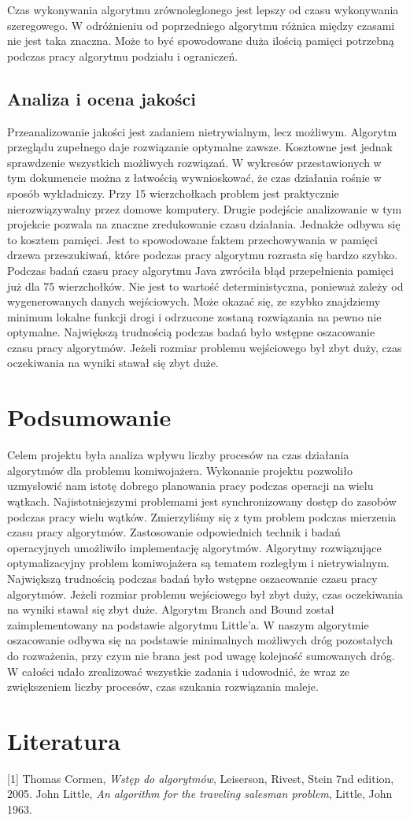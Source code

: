 \documentclass{article}
\begin{document}
	Czas wykonywania algorytmu zrównoleglonego jest lepszy od czasu wykonywania szeregowego. W odróżnieniu od poprzedniego algorytmu różnica między czasami nie jest taka znaczna. Może to być spowodowane duża ilością pamięci potrzebną podczas pracy algorytmu podziału i ograniczeń. 
	
	
	\subsection{Analiza i ocena jakości}
		Przeanalizowanie jakości jest zadaniem nietrywialnym, lecz możliwym. Algorytm przeglądu zupełnego daje rozwiązanie optymalne zawsze. Kosztowne jest jednak sprawdzenie wszystkich możliwych rozwiązań. W wykresów przestawionych w tym dokumencie można z łatwością wywnioskować, że czas działania rośnie w sposób wykładniczy. Przy 15 wierzchołkach problem jest praktycznie nierozwiązywalny przez domowe komputery. Drugie podejście analizowanie w tym projekcie pozwala na znaczne zredukowanie czasu działania. Jednakże odbywa się to kosztem pamięci. Jest to spowodowane faktem przechowywania w pamięci drzewa przeszukiwań, które podczas pracy algorytmu rozrasta się bardzo szybko. Podczas badań czasu pracy algorytmu Java zwróciła błąd przepełnienia pamięci już dla 75 wierzchołków. Nie jest to wartość deterministyczna, ponieważ zależy od wygenerowanych danych wejściowych. Może okazać się, ze szybko znajdziemy minimum lokalne funkcji drogi i odrzucone zostaną rozwiązania na pewno nie optymalne. Największą trudnością podczas badań było wstępne oszacowanie czasu pracy algorytmów. Jeżeli rozmiar problemu wejściowego był zbyt duży, czas oczekiwania na wyniki stawał się zbyt duże.
		\newpage
\section{Podsumowanie}
Celem projektu była analiza wpływu liczby procesów na czas działania algorytmów dla problemu komiwojażera. Wykonanie projektu pozwoliło uzmysłowić nam istotę dobrego planowania pracy podczas operacji na wielu wątkach. Najistotniejszymi problemami jest synchronizowany dostęp do zasobów podczas pracy wielu wątków. Zmierzyliśmy się z tym problem podczas mierzenia czasu pracy algorytmów. Zastosowanie odpowiednich technik i badań operacyjnych umożliwiło implementację algorytmów. Algorytmy rozwiązujące optymalizacyjny problem komiwojażera są tematem rozległym i nietrywialnym. Największą trudnością podczas badań było wstępne oszacowanie czasu pracy algorytmów. Jeżeli rozmiar problemu wejściowego był zbyt duży, czas oczekiwania na wyniki stawał się zbyt duże. Algorytm Branch and Bound został zaimplementowany na podstawie algorytmu Little'a. W naszym algorytmie oszacowanie odbywa się na podstawie minimalnych możliwych dróg pozostałych do rozważenia, przy czym nie brana jest pod uwagę kolejność sumowanych dróg. W całości udało zrealizować wszystkie zadania i udowodnić, że wraz ze zwiększeniem liczby procesów, czas szukania rozwiązania maleje. 
	\newpage
\section*{Literatura}
[1] Thomas Cormen, \emph{Wstęp do algorytmów}, Leiserson, Rivest, Stein 7nd edition, 2005. \newline [2] John Little, \emph{An algorithm for the traveling salesman problem}, Little, John 1963.
\end{document}
